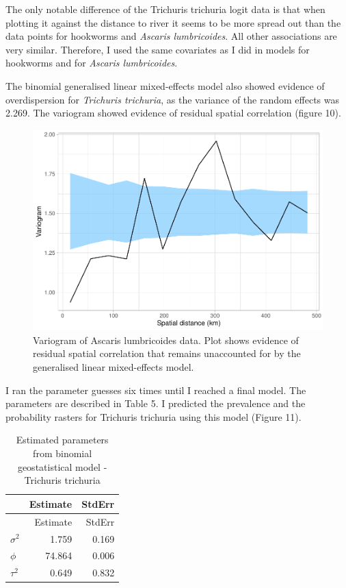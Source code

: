 \documentclass[
]{article}
\begin{document}
The only notable difference of the Trichuris trichuria logit data is
that when plotting it against the distance to river it seems to be more
spread out than the data points for hookworms and \emph{Ascaris
lumbricoides}. All other associations are very similar. Therefore, I
used the same covariates as I did in models for hookworms and for
\emph{Ascaris lumbricoides}.

The binomial generalised linear mixed-effects model also showed evidence
of overdispersion for \emph{Trichuris trichuria}, as the variance of the
random effects was 2.269. The variogram showed evidence of residual
spatial correlation (figure 10).

\begin{figure}
\centering
\includegraphics{write_up_files/figure-latex/TT.variogram_2-1.pdf}
\caption{Variogram of Ascaris lumbricoides data. Plot shows evidence of
residual spatial correlation that remains unaccounted for by the
generalised linear mixed-effects model.}
\end{figure}

I ran the parameter guesses six times until I reached a final model. The
parameters are described in Table 5. I predicted the prevalence and the
probability rasters for Trichuris trichuria using this model (Figure
11).

\begin{longtable}[]{@{}lrr@{}}
\caption{Estimated parameters from binomial geostatistical model -
Trichuris trichuria}\tabularnewline
\toprule
& Estimate & StdErr \\
\midrule
\endfirsthead
\toprule
& Estimate & StdErr \\
\midrule
\endhead
\(\sigma^2\) & 1.759 & 0.169 \\
\(\phi\) & 74.864 & 0.006 \\
\(\tau^2\) & 0.649 & 0.832 \\
\bottomrule
\end{longtable}
\end{document}
